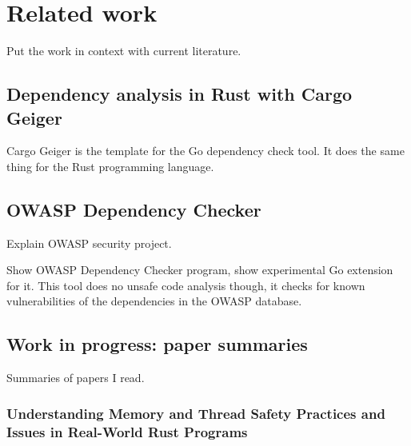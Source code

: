 
\chapter{Related work}\label{ch:related-work}

Put the work in context with current literature.



\section{Dependency analysis in Rust with Cargo Geiger}\label{sec:cargo-geiger}

Cargo Geiger is the template for the Go dependency check tool.
It does the same thing for the Rust programming language.



\section{OWASP Dependency Checker}\label{sec:owasp-dependency-checker}

Explain OWASP security project.

Show OWASP Dependency Checker program, show experimental Go extension for it.
This tool does no unsafe code analysis though, it checks for known vulnerabilities of the dependencies in the
OWASP database.



\section{Work in progress: paper summaries}\label{sec:paper-summaries}

Summaries of papers I read.



\subsection{Understanding Memory and Thread Safety Practices and Issues in Real-World Rust Programs}
\label{subsec:understanding-memory-and-thread-safety-practices-and-issues-in-real-world-rust-programs}

